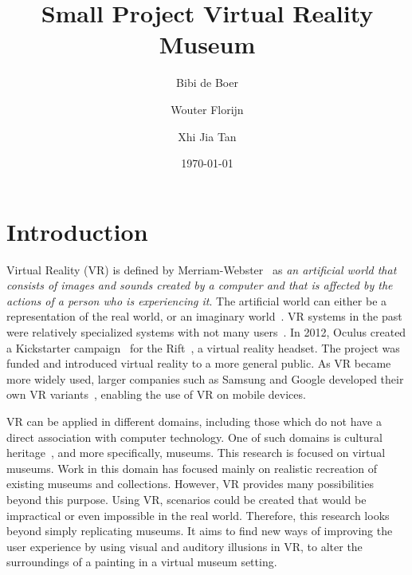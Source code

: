 \documentclass[a4paper]{article}
\title{Small Project Virtual Reality Museum}
\author{Bibi de Boer \and Wouter Florijn \and Xhi Jia Tan}
\date{\today}
\begin{document}
\maketitle


% 
% 
% 
% 
% 
% 
% 
% 
% 
% 
% 
% 
% 
% 

\section{Introduction}

Virtual Reality (VR) is defined by Merriam-Webster~\cite{merriam} as \emph{an artificial world that consists of images and sounds created by a computer and that is affected by the actions of a person who is experiencing it}. The artificial world can either be a representation of the real world, or an imaginary world~\cite{martens}. 
VR systems in the past were relatively specialized systems with not many users~\cite{martens}. In 2012, Oculus created a Kickstarter campaign~\cite{kickstarter} for the Rift~\cite{oculus}, a virtual reality headset. The project was funded and introduced virtual reality to a more general public. As VR became more widely used, larger companies such as Samsung and Google developed their own VR variants~\cite{gearvr, cardboard}, enabling the use of VR on mobile devices. 

VR can be applied in different domains, including those which do not have a direct association with computer technology. One of such domains is cultural heritage~\cite{wojciechowski}, and more specifically, museums. This research is focused on virtual museums. Work in this domain has focused mainly on realistic recreation of existing museums and collections. However, VR provides many possibilities beyond this purpose. Using VR, scenarios could be created that would be impractical or even impossible in the real world. Therefore, this research looks beyond simply replicating museums. It aims to find new ways of improving the user experience by using visual and auditory illusions in VR, to alter the surroundings of a painting in a virtual museum setting.
\end{document}
